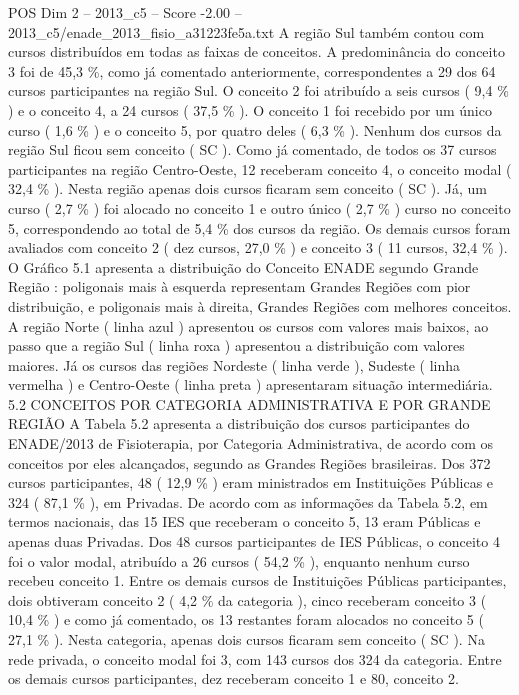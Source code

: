 \begin{textsample}{POS Dim 2 – 2013\_c5 – Score -2.00 – 2013\_c5/enade\_2013\_fisio\_a31223fe5a.txt}
A região Sul também contou com cursos distribuídos em todas as faixas de conceitos.
A predominância do conceito 3 foi de 45,3 \%, como já comentado anteriormente, correspondentes a 29 dos 64 cursos participantes na região Sul.
O conceito 2 foi atribuído a seis cursos ( 9,4 \% ) e o conceito 4, a 24 cursos ( 37,5 \% ).
O conceito 1 foi recebido por um único curso ( 1,6 \% ) e o conceito 5, por quatro deles ( 6,3 \% ).
Nenhum dos cursos da região Sul ficou sem conceito ( SC ).
Como já comentado, de todos os 37 cursos participantes na região Centro-Oeste, 12 receberam conceito 4, o conceito modal ( 32,4 \% ).
Nesta região apenas dois cursos ficaram sem conceito ( SC ).
Já, um curso ( 2,7 \% ) foi alocado no conceito 1 e outro único ( 2,7 \% ) curso no conceito 5, correspondendo ao total de 5,4 \% dos cursos da região.
Os demais cursos foram avaliados com conceito 2 ( dez cursos, 27,0 \% ) e conceito 3 ( 11 cursos, 32,4 \% ).
O Gráfico 5.1 apresenta a distribuição do Conceito ENADE segundo Grande Região : poligonais mais à esquerda representam Grandes Regiões com pior distribuição, e poligonais mais à direita, Grandes Regiões com melhores conceitos.
A região Norte ( linha azul ) apresentou os cursos com valores mais baixos, ao passo que a região Sul ( linha roxa ) apresentou a distribuição com valores maiores.
Já os cursos das regiões Nordeste ( linha verde ), Sudeste ( linha vermelha ) e Centro-Oeste ( linha preta ) apresentaram situação intermediária. 5.2 CONCEITOS POR CATEGORIA ADMINISTRATIVA E POR GRANDE REGIÃO A Tabela 5.2 apresenta a distribuição dos cursos participantes do ENADE/2013 de Fisioterapia, por Categoria Administrativa, de acordo com os conceitos por eles alcançados, segundo as Grandes Regiões brasileiras.
Dos 372 cursos participantes, 48 ( 12,9 \% ) eram ministrados em Instituições Públicas e 324 ( 87,1 \% ), em Privadas.
De acordo com as informações da Tabela 5.2, em termos nacionais, das 15 IES que receberam o conceito 5, 13 eram Públicas e apenas duas Privadas.
Dos 48 cursos participantes de IES Públicas, o conceito 4 foi o valor modal, atribuído a 26 cursos ( 54,2 \% ), enquanto nenhum curso recebeu conceito 1.
Entre os demais cursos de Instituições Públicas participantes, dois obtiveram conceito 2 ( 4,2 \% da categoria ), cinco receberam conceito 3 ( 10,4 \% ) e como já comentado, os 13 restantes foram alocados no conceito 5 ( 27,1 \% ).
Nesta categoria, apenas dois cursos ficaram sem conceito ( SC ).
Na rede privada, o conceito modal foi 3, com 143 cursos dos 324 da categoria.
Entre os demais cursos participantes, dez receberam conceito 1 e 80, conceito 2.

\end{textsample}
